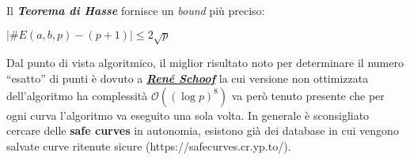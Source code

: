 Il \textbf{\textit{Teorema di Hasse}} fornisce un \textit{bound} più preciso:
\begin{center}
    $|\#E(a, b, p) - (p + 1)| \leq 2\sqrt{p}$
\end{center}
Dal punto di vista algoritmico, il miglior risultato noto per determinare il numero ``esatto'' di punti è dovuto a \textbf{\textit{\href{http://www.numdam.org/item/JTNB_1995__7_1_219_0.pdf}{René Schoof}}} la cui versione non ottimizzata dell'algoritmo ha complessità $\mathcal{O}((\log{p})^8)$ va però tenuto presente che per ogni curva l'algoritmo va eseguito una sola volta. In generale è sconsigliato cercare delle \textbf{safe curves} in autonomia, esistono già dei database in cui vengono salvate curve ritenute sicure (https://safecurves.cr.yp.to/).